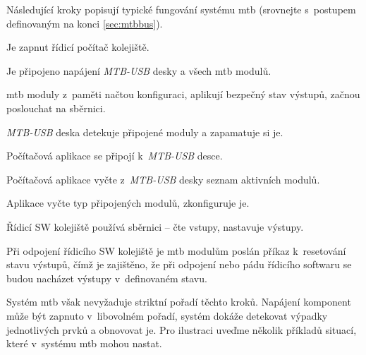 Následující kroky popisují typické fungování systému \gls{mtb} (srovnejte
s~postupem definovaným na konci \ref{sec:mtbbus}).

\begin{compactenum}
\item Je zapnut řídicí počítač kolejiště.
\item Je připojeno napájení \textit{MTB-USB} desky a všech \gls{mtb} modulů.
\item \gls{mtb} moduly z~paměti načtou konfiguraci, aplikují bezpečný stav
výstupů, začnou poslouchat na sběrnici.
\item \textit{MTB-USB} deska detekuje připojené moduly a zapamatuje si je.
\item Počítačová aplikace se připojí k~\textit{MTB-USB} desce.
\item Počítačová aplikace vyčte z~\textit{MTB-USB} desky seznam aktivních modulů.
\item Aplikace vyčte typ připojených modulů, zkonfiguruje je.
\item Řídicí SW kolejiště používá sběrnici – čte vstupy, nastavuje výstupy.
\item Při odpojení řídicího SW kolejiště je \gls{mtb} modulům poslán příkaz
	k~resetování stavu výstupů, čímž je zajištěno, že při odpojení nebo pádu
	řídicího softwaru se budou nacházet výstupy v~definovaném stavu.
\end{compactenum}

Systém \gls{mtb} však nevyžaduje striktní pořadí těchto kroků. Napájení
komponent může být zapnuto v~libovolném pořadí, systém dokáže detekovat výpadky
jednotlivých prvků a obnovovat je. Pro ilustraci uveďme několik příkladů situací,
které v~systému \gls{mtb} mohou nastat.

